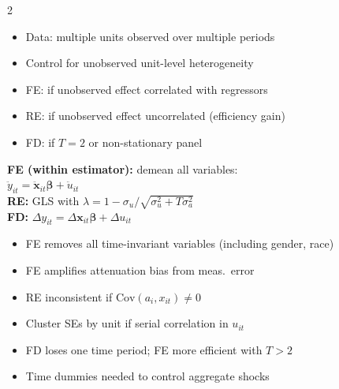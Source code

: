 \documentclass[10pt,a4paper]{article}
\begin{document}
\begin{multicols}{2}

\begin{tcolorbox}[when]
\begin{itemize}
  \item Data: multiple units observed over multiple periods
  \item Control for unobserved unit-level heterogeneity
  \item FE: if unobserved effect correlated with regressors
  \item RE: if unobserved effect uncorrelated (efficiency gain)
  \item FD: if $T = 2$ or non-stationary panel
\end{itemize}
\end{tcolorbox}

\begin{tcolorbox}[key]
\textbf{FE (within estimator):} demean all variables:\\
$\ddot{y}_{it} = \ddot{\mathbf{x}}_{it}\boldsymbol\beta + \ddot{u}_{it}$\\[4pt]
\textbf{RE:} GLS with $\lambda = 1 - \sigma_u/\sqrt{\sigma_u^2 + T\sigma_a^2}$\\[4pt]
\textbf{FD:} $\Delta y_{it} = \Delta\mathbf{x}_{it}\boldsymbol\beta + \Delta u_{it}$
\end{tcolorbox}

\columnbreak

\begin{tcolorbox}[watchout]
\begin{itemize}
  \item FE removes all time-invariant variables (including gender, race)
  \item FE amplifies attenuation bias from meas.\ error
  \item RE inconsistent if $\text{Cov}(a_i, x_{it}) \neq 0$
  \item Cluster SEs by unit if serial correlation in $u_{it}$
  \item FD loses one time period; FE more efficient with $T > 2$
  \item Time dummies needed to control aggregate shocks
\end{itemize}
\end{tcolorbox}

\end{multicols}
\end{document}

